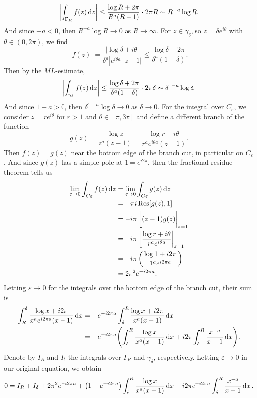 \documentclass[12pt]{article}
\theoremstyle{definition}
\newcommand{\eps}{\varepsilon}
\newcommand{\pfrac}[2]{\left(\frac{#1}{#2}\right)}
\begin{document}
\[
    \qty|\int_{\Gamma_R} f(z) \dd{z}|
        \leq\frac{\log R  + 2\pi}{R^a(R - 1)} \cdot 2\pi R
        \sim R^{-a}\log R.
\]
And since $-a < 0$, then $R^{-a}\log R \to 0$ as $R \to \infty$. For $z \in \gamma_\delta$, so $z = \delta e^{i\theta}$ with $\theta \in (0, 2\pi)$, we find
\[
    |f(z)|
        = \frac{|\log \delta + i\theta|}{\delta^a|e^{i\theta a}||z - 1|}
        \leq \frac{\log \delta  + 2\pi}{\delta^a(1 - \delta)}.
\]
Then by the $ML$-estimate,
\[
    \qty|\int_{\gamma_\delta} f(z) \dd{z}|
        \leq \frac{\log \delta  + 2\pi}{\delta^a(1 - \delta)} \cdot 2\pi \delta
        \sim \delta^{1-a} \log \delta.
\]
And since $1-a > 0$, then $\delta^{1-a} \log \delta \to 0$ as $\delta \to 0$. For the integral over $C_\eps$, we consider $z = re^{i\theta}$ for $r > 1$ and $\theta \in [\pi, 3\pi]$ and define a different branch of the function
\[
    g(z)
        = \frac{\log z}{z^a(z - 1)}
        = \frac{\log r + i\theta}{r^ae^{i\theta a}(z - 1)}.
\]
Then $f(z) = g(z)$ near the bottom edge of the branch cut, in particular on $C_\eps$. And since $g(z)$ has a simple pole at $1 = e^{i2\pi}$, then the fractional residue theorem tells us
\begin{align*}
    \lim_{\eps \to 0} \int_{C\eps} f(z) \dd{z}
        &= \lim_{\eps \to 0} \int_{C\eps} g(z) \dd{z} \\
        &= -\pi i \Res[g(z), 1] \\
        &= -i\pi \eval[(z - 1) g(z)|_{z = 1} \\
        &= -i\pi \eval[\frac{\log r + i\theta}{r^ae^{i\theta a}}|_{z = 1} \\
        &= -i\pi \pfrac{\log 1 + i2\pi}{1^ae^{i2\pi a}} \\
        &= 2\pi^2 e^{-i2\pi a}.
\end{align*}
Letting $\eps \to 0$ for the integrals over the bottom edge of the branch cut, their sum is
\begin{align*}
    \int_{R}^{\delta} \frac{\log x + i2\pi}{x^a e^{i2\pi a}(x - 1)} \dd{x}
        &= -e^{-i2\pi a} \int_{\delta}^{R} \frac{\log x + i2\pi}{x^a(x - 1)} \dd{x} \\
        &= -e^{-i2\pi a} \qty(\int_{\delta}^{R} \frac{\log x}{x^a (x - 1)} \dd{x} + i2\pi \int_{\delta}^{R} \frac{x^{-a}}{x - 1} \dd{x}).
\end{align*}
Denote by $I_R$ and $I_\delta$ the integrals over $\Gamma_R$ and $\gamma_\delta$, respectively. Letting $\eps \to 0$ in our original equation, we obtain
\[
    0 = I_R + I_\delta + 2\pi^2e^{-i2\pi a} 
        + \qty(1 - e^{-i2\pi a})\int_{\delta}^{R} \frac{\log x}{x^a(x-1)} \dd{x}
        - i2\pi e^{-i2\pi a} \int_{\delta}^{R} \frac{x^{-a}}{x - 1} \dd{x}.
\]
\end{document}
